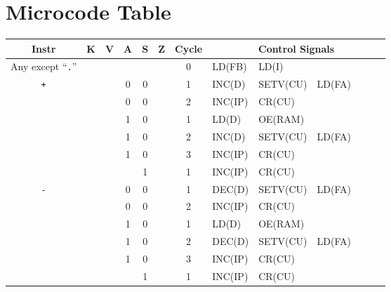 \section{Microcode Table} \label{sec:appendix:microcode}

\begin{footnotesize}
  \begin{longtable}[c] {c|ccccc|c|llllll}
                     Instr          & K & V & A & S     & Z    & Cycle & \multicolumn{6}{c}{Control Signals}                      \\ \hline
    \rowcolor{White} Any except ``\texttt{.}''          &   &   &       &      &      & 0   & LD(FB)          & LD(I)         &        &        &        \\ \hline
    \rowcolor{Gray}  \texttt{+}   &   &   & 0 & 0     &      & 1     & INC(D)   & SETV(CU) & LD(FA)  &        &        &        \\
    \rowcolor{Gray}               &   &   & 0 & 0     &      & 2     & INC(IP)  & CR(CU)   &         &        &        &        \\    
    \rowcolor{White}              &   &   & 1 & 0     &      & 1     & LD(D)    & OE(RAM)  &         &        &        &        \\
    \rowcolor{White}              &   &   & 1 & 0     &      & 2     & INC(D)   & SETV(CU) & LD(FA)  &        &        &        \\
    \rowcolor{White}              &   &   & 1 & 0     &      & 3     & INC(IP)  & CR(CU)   &         &        &        &        \\
    \rowcolor{Gray}               &   &   &   & 1     &      & 1     & INC(IP)  & CR(CU)   &         &        &        &        \\ \hline
    
    \rowcolor{Gray}  \texttt{-}   &   &   & 0 & 0     &      & 1     & DEC(D)   & SETV(CU) & LD(FA)  &        &        &        \\
    \rowcolor{Gray}               &   &   & 0 & 0     &      & 2     & INC(IP)  & CR(CU)   &         &        &        &        \\    
    \rowcolor{White}              &   &   & 1 & 0     &      & 1     & LD(D)    & OE(RAM)  &         &        &        &        \\
    \rowcolor{White}              &   &   & 1 & 0     &      & 2     & DEC(D)   & SETV(CU) & LD(FA)  &        &        &        \\
    \rowcolor{White}              &   &   & 1 & 0     &      & 3     & INC(IP)  & CR(CU)   &         &        &        &        \\
    \rowcolor{Gray}               &   &   &   & 1     &      & 1     & INC(IP)  & CR(CU)   &         &        &        &        \\ \hline


\end{longtable}
\end{footnotesize}

